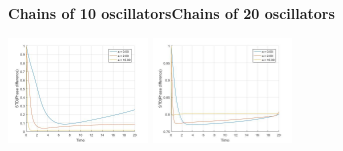 \documentclass[a4paper]{scrartcl}
\begin{document}
\begin{figure}[!t]
	\hspace{0.4 cm}\textbf{Chains of 10 oscillators}\hspace{0.9 cm}\textbf{Chains of 20 oscillators}
	
	\includegraphics[width=0.33\textwidth]{results/6.a/N10_E_const.jpg}
	\includegraphics[width=0.33\textwidth]{results/6.a/N20_E_const.jpg}
	

\end{figure}
\end{document}
